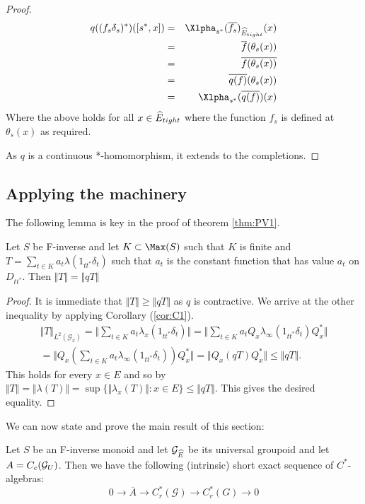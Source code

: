 \begin{corollary}
\begin{proof}
\begin{eqnarray*}
q((f_{s}\delta_{s})^{*})([s^{*},x])& = &\Xlpha_{s^{*}}(\overline{f_{s}})_{\E_{tight}}(x)\\
& = & \overline{f}(\theta_{s}(x)) \\ & = & \overline{f(\theta_{s}(x))} \\ & = & \overline{q(f)}(\theta_{s}(x)) \\ & = &  \Xlpha_{s^{*}}(\overline{q(f)})(x)
\end{eqnarray*}
Where the above holds for all $x \in \widehat{E}_{tight}$ where the function $f_{s}$ is defined at $\theta_{s}(x)$ as required.

As $q$ is a continuous *-homomorphism, it extends to the completions.
\end{proof}

\subsection{Applying the machinery}\label{sect:S1-a}
The following lemma is key in the proof of theorem \ref{thm:PV1}.
\begin{lemma}\label{lem:L3}
Let $S$ be F-inverse and let $K \subset \Max(S)$ such that $K$ is finite and $T=\sum_{t \in K} a_{t}\lambda(1_{tt^{*}}\delta_{t})$ such that $a_{t}$ is the constant function that has value $a_{t}$ on $D_{tt^{*}}$. Then $\Vert T \Vert = \Vert qT \Vert$
\end{lemma}
\begin{proof}
It is immediate that $\Vert T \Vert \geq \Vert qT \Vert$ as $q$ is contractive. We arrive at the other inequality by applying Corollary (\ref{cor:C1}).
\begin{eqnarray*}
\Vert T \Vert_{L^{2}(\mathcal{G}_{x})} = \Vert \sum_{t \in K} a_{t}\lambda_{x}(1_{tt^{*}}\delta_{t}) \Vert = \Vert \sum_{t \in K} a_{t}Q_{x}\lambda_{\infty}(1_{tt^{*}}\delta_{t})Q_{x}^{*} \Vert \\
= \Vert Q_{x}(\sum_{t \in K} a_{t}\lambda_{\infty}(1_{tt^{*}}\delta_{t}))Q_{x}^{*} \Vert = \Vert Q_{x}(qT)Q_{x}^{*} \Vert \leq \Vert qT \Vert.
\end{eqnarray*}
This holds for every $x \in E$ and so by  $\Vert T \Vert = \Vert \lambda(T) \Vert = \sup \lbrace \Vert \lambda_{x}(T) \Vert : x \in E \rbrace \leq \Vert qT \Vert$. This gives the desired equality.  
\end{proof}

We can now state and prove the main result of this section:

\begin{theorem}\label{thm:PV1}
Let $S$ be an F-inverse monoid and let $\mathcal{G}_{\widehat{E}}$ be its universal groupoid and let $A=C_{c}(\mathcal{G}_{U})$. Then we have the following (intrinsic) short exact sequence of $C^{*}$-algebras:
\begin{equation*}
0 \rightarrow \overline{A} \rightarrow C^{*}_{r}(\mathcal{G}) \rightarrow C^{*}_{r}(G) \rightarrow 0
\end{equation*}
\end{theorem}


\end{corollary}
